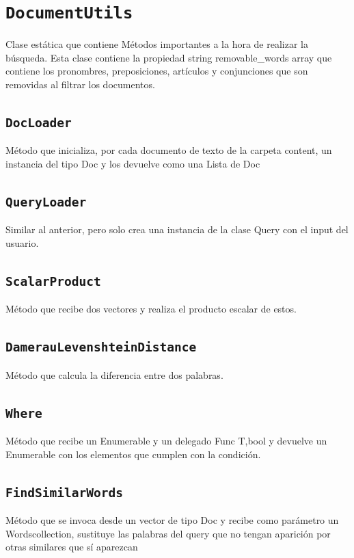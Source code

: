 \documentclass{report}
\newcommand{\csharpproperty}[1]{\textcolor{csharp-property}{\texttt{#1}}}
\begin{document}
\section{\LARGE\csharpproperty{DocumentUtils}}
Clase estática que contiene Métodos importantes a la hora de realizar la búsqueda.
Esta clase contiene la propiedad string removable\_{}words array que contiene los pronombres, 
preposiciones, artículos y conjunciones que son removidas al filtrar los documentos.

\subsection{\csharpproperty{DocLoader}} Método que inicializa, por cada documento de texto de la carpeta content, un instancia del tipo 
Doc y los devuelve como una Lista de Doc
\subsection{\csharpproperty{QueryLoader}} Similar al anterior, pero solo crea una instancia de la clase Query con el input del usuario.
\subsection{\csharpproperty{ScalarProduct}} Método que recibe dos vectores y realiza el producto escalar de estos.
\subsection{\csharpproperty{DamerauLevenshteinDistance}} Método que calcula la diferencia entre dos palabras.
\subsection{\csharpproperty{Where}} Método que recibe un Enumerable y un delegado Func T,bool y devuelve un Enumerable con 
los elementos que cumplen con la condición.
\subsection{\csharpproperty{FindSimilarWords}} Método que se invoca desde un vector de tipo Doc y recibe como parámetro un 
Wordscollection, sustituye las palabras del query que no tengan aparición por otras similares que sí 
aparezcan
\end{document}
